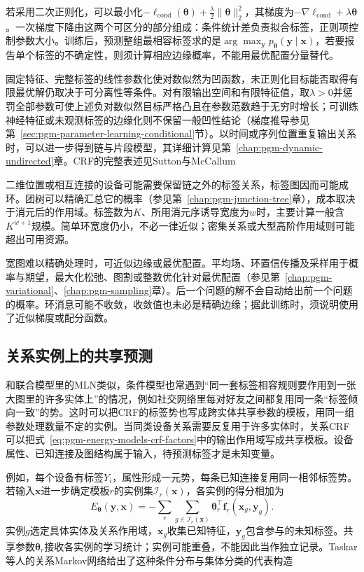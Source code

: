 若采用二次正则化，可以最小化$-\ell_{\mathrm{cond}}(\bm{\theta})+\frac\lambda2\lVert\bm{\theta}\rVert_2^2$，其梯度为$-\nabla\ell_{\mathrm{cond}}+\lambda\bm{\theta}$。一次梯度下降由这两个可区分的部分组成：条件统计差负责拟合标签，正则项控制参数大小。训练后，预测整组最相容标签求的是$\arg\max_{\bm{y}}p_{\bm{\theta}}(\bm{y}\mid\bm{x})$，若要报告单个标签的不确定性，则须计算相应边缘概率，不能用最优配置分量替代。

固定特征、完整标签的线性参数化使对数似然为凹函数，未正则化目标能否取得有限最优解仍取决于可分离性等条件。对有限输出空间和有限特征值，取$\lambda>0$并惩罚全部参数可使上述负对数似然目标严格凸且在参数范数趋于无穷时增长；可训练神经特征或未观测标签的边缘化则不保留一般凹性结论（梯度推导参见第~\ref{sec:pgm-parameter-learning-conditional}节）。以时间或序列位置重复输出关系时，可以进一步得到链与片段模型，其详细计算见第~\ref{chap:pgm-dynamic-undirected}章。CRF的完整表述见Sutton与McCallum

二维位置或相互连接的设备可能需要保留链之外的标签关系，标签图因而可能成环。团树可以精确汇总它的概率（参见第~\ref{chap:pgm-junction-tree}章），成本取决于消元后的作用域。标签数为$K$、所用消元序诱导宽度为$w$时，主要计算一般含$K^{w+1}$规模。简单环宽度仍小，不必一律近似；密集关系或大型高阶作用域则可能超出可用资源。

宽图难以精确处理时，可近似边缘或最优配置。平均场、环置信传播及采样用于概率与期望，最大化松弛、图割或整数优化针对最优配置（参见第~\ref{chap:pgm-variational}、\ref{chap:pgm-sampling}章）。后一个问题的解不会自动给出前一个问题的概率。环消息可能不收敛，收敛值也未必是精确边缘；据此训练时，须说明使用了近似梯度或配分函数。

\subsection{关系实例上的共享预测}
\label{sec:pgm-energy-models-general-relational}

和联合模型里的MLN类似，条件模型也常遇到“同一套标签相容规则要作用到一张大图里的许多实体上”的情况，例如社交网络里每对好友之间都复用同一条“标签倾向一致”的势。这时可以把CRF的标签势也写成跨实体共享参数的模板，用同一组参数处理数量不定的实例。当同类设备关系需要反复用于许多实体时，关系CRF可以把式~\eqref{eq:pgm-energy-models-crf-factors}中的输出作用域写成共享模板。设备属性、已知连接及图结构属于输入，待预测标签才是未知变量。

例如，每个设备有标签$Y_i$，属性形成一元势，每条已知连接复用同一相邻标签势。若输入$\bm{x}$进一步确定模板$r$的实例集$\mathcal{I}_r(\bm{x})$，各实例的得分相加为
\begin{equation}
  E_{\bm{\theta}}(\bm{y},\bm{x})
   =-\sum_r\sum_{g\in\mathcal{I}_r(\bm{x})}
        \bm{\theta}_r^\top
             \bm{f}_r(\bm{x}_g,\bm{y}_g).
  \label{eq:pgm-energy-models-relational-crf}
\end{equation}
实例$g$选定具体实体及关系作用域，$\bm{x}_g$收集已知特征，$\bm{y}_g$包含参与的未知标签。共享参数$\bm{\theta}_r$接收各实例的学习统计；实例可能重叠，不能因此当作独立记录。Taskar等人的关系Markov网络给出了这种条件分布与集体分类的代表构造

